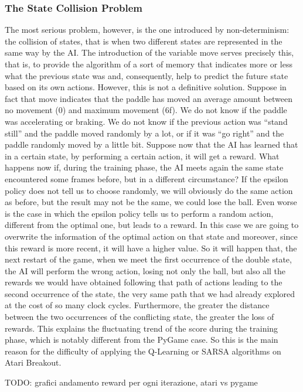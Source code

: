 \subsubsection{The State Collision Problem}

The most serious problem, however, is the one introduced by non-determinism:
the collision of states, that is when two different states are represented in
the same way by the AI. The introduction of the variable move serves precisely
this, that is, to provide the algorithm of a sort of memory that indicates
more or less what the previous state was and, consequently, help to predict
the future state based on its own actions. However, this is not a definitive
solution. Suppose in fact that move indicates that the paddle has moved an
average amount between no movement (0) and maximum movement (6f). We do not
know if the paddle was accelerating or braking. We do not know if the previous
action was ``stand still'' and the paddle moved randomly by a lot, or if it was
``go right'' and the paddle randomly moved by a little bit. Suppose now that the
AI has learned that in a certain state, by performing a certain action, it
will get a reward. What happens now if, during the training phase, the AI
meets again the same state encountered some frames before, but in a different
circumstance? If the epsilon policy does not tell us to choose randomly,
we will obviously do the same action as before, but the result may not be the
same, we could lose the ball. Even worse is the case in which the epsilon
policy tells us to perform a random action, different from the optimal one,
but leads to a reward. In this case we are going to overwrite the information
of the optimal action on that state and moreover, since this reward is more
recent, it will have a higher value. So it will happen that, the next restart
of the game, when we meet the first occurrence of the double state, the AI
will perform the wrong action, losing not only the ball, but also all the
rewards we would have obtained following that path of actions leading to the
second occurrence of the state, the very same path that we had already explored
at the cost of so many clock cycles. Furthermore, the greater the distance
between the two occurrences of the conflicting state, the greater the loss of
rewards. This explains the fluctuating trend of the score during the training
phase, which is notably different from the PyGame case. So this is the main
reason for the difficulty of applying the Q-Learning or SARSA algorithms on
Atari Breakout.

\smallskip
TODO: grafici andamento reward per ogni iterazione, atari vs pygame
\smallskip
